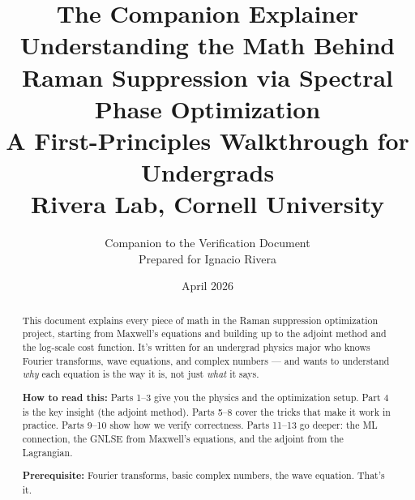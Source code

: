 \documentclass[12pt,a4paper]{article}
\title{\textbf{The Companion Explainer}\\[6pt]
Understanding the Math Behind\\
Raman Suppression via Spectral Phase Optimization\\[12pt]
\large A First-Principles Walkthrough for Undergrads\\[6pt]
\normalsize Rivera Lab, Cornell University}
\author{Companion to the Verification Document\\
\small Prepared for Ignacio Rivera}
\date{April 2026}
\begin{document}
\maketitle
\thispagestyle{empty}

\begin{abstract}
This document explains every piece of math in the Raman suppression optimization project, starting from Maxwell's equations and building up to the adjoint method and the log-scale cost function. It's written for an undergrad physics major who knows Fourier transforms, wave equations, and complex numbers --- and wants to understand \emph{why} each equation is the way it is, not just \emph{what} it says.

\medskip\noindent\textbf{How to read this:} Parts 1--3 give you the physics and the optimization setup. Part 4 is the key insight (the adjoint method). Parts 5--8 cover the tricks that make it work in practice. Parts 9--10 show how we verify correctness. Parts 11--13 go deeper: the ML connection, the GNLSE from Maxwell's equations, and the adjoint from the Lagrangian.

\medskip\noindent\textbf{Prerequisite:} Fourier transforms, basic complex numbers, the wave equation. That's it.
\end{abstract}
\end{document}
